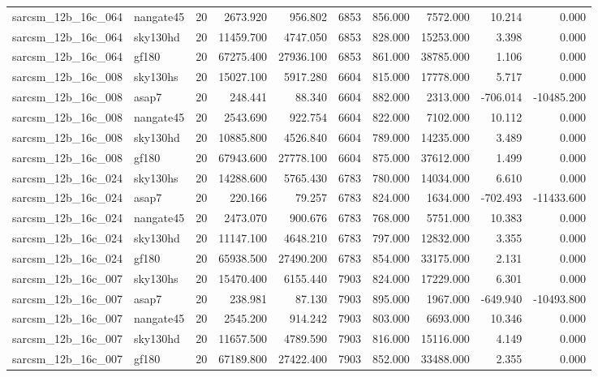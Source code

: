\documentclass{article}
\begin{document}
\begin{longtable}{llrrrrrrrr}
sarcsm\_12b\_16c\_064 & nangate45 & 20 & 2673.920 & 956.802 & 6853 & 856.000 & 7572.000 & 10.214 & 0.000 \\
sarcsm\_12b\_16c\_064 & sky130hd & 20 & 11459.700 & 4747.050 & 6853 & 828.000 & 15253.000 & 3.398 & 0.000 \\
sarcsm\_12b\_16c\_064 & gf180 & 20 & 67275.400 & 27936.100 & 6853 & 861.000 & 38785.000 & 1.106 & 0.000 \\
sarcsm\_12b\_16c\_008 & sky130hs & 20 & 15027.100 & 5917.280 & 6604 & 815.000 & 17778.000 & 5.717 & 0.000 \\
sarcsm\_12b\_16c\_008 & asap7 & 20 & 248.441 & 88.340 & 6604 & 882.000 & 2313.000 & -706.014 & -10485.200 \\
sarcsm\_12b\_16c\_008 & nangate45 & 20 & 2543.690 & 922.754 & 6604 & 822.000 & 7102.000 & 10.112 & 0.000 \\
sarcsm\_12b\_16c\_008 & sky130hd & 20 & 10885.800 & 4526.840 & 6604 & 789.000 & 14235.000 & 3.489 & 0.000 \\
sarcsm\_12b\_16c\_008 & gf180 & 20 & 67943.600 & 27778.100 & 6604 & 875.000 & 37612.000 & 1.499 & 0.000 \\
sarcsm\_12b\_16c\_024 & sky130hs & 20 & 14288.600 & 5765.430 & 6783 & 780.000 & 14034.000 & 6.610 & 0.000 \\
sarcsm\_12b\_16c\_024 & asap7 & 20 & 220.166 & 79.257 & 6783 & 824.000 & 1634.000 & -702.493 & -11433.600 \\
sarcsm\_12b\_16c\_024 & nangate45 & 20 & 2473.070 & 900.676 & 6783 & 768.000 & 5751.000 & 10.383 & 0.000 \\
sarcsm\_12b\_16c\_024 & sky130hd & 20 & 11147.100 & 4648.210 & 6783 & 797.000 & 12832.000 & 3.355 & 0.000 \\
sarcsm\_12b\_16c\_024 & gf180 & 20 & 65938.500 & 27490.200 & 6783 & 854.000 & 33175.000 & 2.131 & 0.000 \\
sarcsm\_12b\_16c\_007 & sky130hs & 20 & 15470.400 & 6155.440 & 7903 & 824.000 & 17229.000 & 6.301 & 0.000 \\
sarcsm\_12b\_16c\_007 & asap7 & 20 & 238.981 & 87.130 & 7903 & 895.000 & 1967.000 & -649.940 & -10493.800 \\
sarcsm\_12b\_16c\_007 & nangate45 & 20 & 2545.200 & 914.242 & 7903 & 803.000 & 6693.000 & 10.346 & 0.000 \\
sarcsm\_12b\_16c\_007 & sky130hd & 20 & 11657.500 & 4789.590 & 7903 & 816.000 & 15116.000 & 4.149 & 0.000 \\
sarcsm\_12b\_16c\_007 & gf180 & 20 & 67189.800 & 27422.400 & 7903 & 852.000 & 33488.000 & 2.355 & 0.000 \\

\end{longtable}
\end{document}
